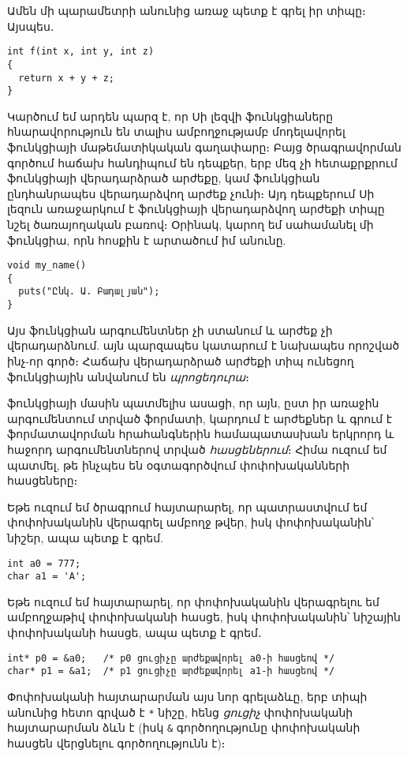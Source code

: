 Ամեն մի պարամետրի անունից առաջ պետք է գրել իր տիպը։ Այսպես․

\begin{Verbatim}
int f(int x, int y, int z)
{
  return x + y + z;
}
\end{Verbatim}

Կարծում եմ արդեն պարզ է, որ Սի լեզվի ֆունկցիաները հնարավորություն են տալիս
ամբողջությամբ մոդելավորել ֆունկցիայի մաթեմատիկական գաղափարը։ Բայց ծրագրավորման
գործում հաճախ հանդիպում են դեպքեր, երբ մեզ չի հետաքրքրում ֆունկցիայի
վերադարձրած արժեքը, կամ ֆունկցիան ընդհանրապես վերադարձվող արժեք չունի։ Այդ
դեպքերում Սի լեզուն առաջարկում է ֆունկցիայի վերադարձվող արժեքի տիպը նշել
 ծառայողական բառով։ Օրինակ, կարող եմ սահամանել մի
ֆունկցիա, որն  հոսքին է արտածում իմ անունը.

\begin{Verbatim}
void my_name()
{
  puts("Ընկ. Ա. Բադալյան");
}
\end{Verbatim}

Այս ֆունկցիան արգումենտներ չի ստանում և արժեք չի վերադարձնում. այն
պարզապես կատարում է նախապես որոշված ինչ-որ գործ։ Հաճախ 
վերադարձրած արժեքի տիպ ունեցող ֆունկցիային անվանում են
\emph{պրոցեդուրա}։

 ֆունկցիայի մասին պատմելիս ասացի, որ այն,
ըստ իր առաջին արգումենտում տրված ֆորմատի, կարդում է արժեքներ և գրում
է ֆորմատավորման հրահանգներին համապատասխան երկրորդ և հաջորդ արգումենտներով
տրված \emph{հասցեներում}։ Հիմա ուզում եմ պատմել,
թե ինչպես են օգտագործվում փոփոխականների հասցեները։

Եթե ուզում եմ ծրագրում հայտարարել, որ պատրաստվում եմ  փոփոխականին
վերագրել ամբողջ թվեր, իսկ  փոփոխականին՝ նիշեր, ապա պետք է գրեմ.

\begin{Verbatim}
int a0 = 777;
char a1 = 'A';
\end{Verbatim}

Եթե ուզում եմ հայտարարել, որ  փոփոխականին վերագրելու եմ ամբողջաթիվ
փոփոխականի հասցե, իսկ  փոփոխականին՝ նիշային փոփոխականի հասցե,
ապա պետք է գրեմ․

\begin{Verbatim}
int* p0 = &a0;   /* p0 ցուցիչը արժեքավորել a0-ի հասցեով */
char* p1 = &a1;  /* p1 ցուցիչը արժեքավորել a1-ի հասցեով */
\end{Verbatim}

Փոփոխականի հայտարարման այս նոր գրելաձևը, երբ տիպի անունից հետո գրված
է \verb|*| նիշը, հենց \emph{ցուցիչ} փոփոխականի հայտարարման ձևն է (իսկ
\verb|&| գործողությունը փոփոխականի հասցեն վերցնելու գործողությունն է)։

